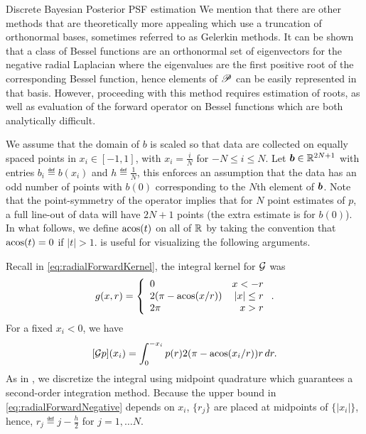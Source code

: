 \begin{chapter}{Discrete Bayesian Posterior PSF estimation}
We mention that there are other methods that are theoretically more appealing which use a truncation of orthonormal bases, sometimes referred to as Gelerkin methods.
It can be shown that a class of Bessel functions are an orthonormal set of eigenvectors for the negative radial Laplacian where the eigenvalues are the first positive root of the corresponding Bessel function, hence elements of $\mathscr P$ can be easily represented in that basis.
However, proceeding with this method requires estimation of roots, as well as evaluation of the forward operator on Bessel functions which are both analytically difficult.


We assume that the domain of $b$ is scaled so that data are collected on equally spaced points in $x_i \in [-1,1]$, with $x_i = \frac iN$ for $-N\le i\le N$.
Let $\mbox{\boldmath$b$} \in \mathbb R^{2N + 1}$ with entries $b_i \eqdef b(x_i)$ and $h\eqdef \frac 1N$, this enforces an assumption that the data has an odd number of points with $b(0)$ corresponding to the $N$th element of $\mbox{\boldmath$b$}$. 
Note that the point-symmetry of the operator implies that for $N$ point estimates of $p$, a full line-out of data will have $2N + 1$ points (the extra estimate is for $b(0)$).
In what follows, we define $\operatorname*{acos}(t)$ on all of $\mathbb R$ by taking the convention that $\operatorname*{acos}(t) = 0$ if $|t| > 1$.
 is useful for visualizing the following arguments.

Recall in \eqref{eq:radialForwardKernel}, the integral kernel for $\mathcal G$ was
\begin{equation} 
  g(x,r) = \left\{\begin{array}{lr}
    0 & x < - r\\
    2(\pi - \operatorname*{acos}(x/r)) & |x| \le r\\
    2\pi &  x> r
  \end{array}\right..  
\end{equation}
For a fixed  $x_i<0$, we have
\begin{equation} \label{eq:radialForwardNegative}
  [\mathcal G p](x_i) = \int_0^{-x_i} p(r)2(\pi - \operatorname*{acos}(x_i/r))r\,dr.
\end{equation}
As in \citep{bardsley2012mcmc}, we discretize the integral using midpoint quadrature which guarantees a second-order integration method.
Because the upper bound in \eqref{eq:radialForwardNegative} depends on $x_i$, $\{r_j\}$ are placed at midpoints of $\{|x_i|\}$, hence, $r_j \eqdef j-\frac h2$ for $j=1,\dots N$. 


\end{chapter}
